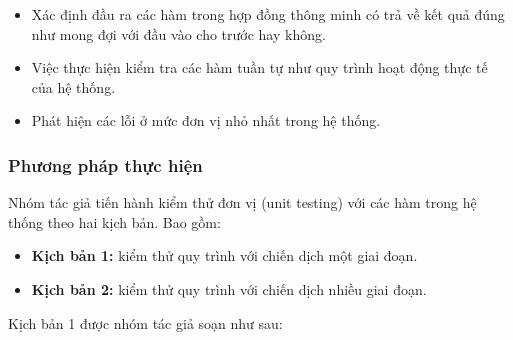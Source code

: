 \documentclass[../main-report.tex]{subfiles}
\begin{document}
\begin{itemize}
\item Xác định đầu ra các hàm trong hợp đồng thông minh có trả về kết quả đúng như mong đợi với đầu vào cho trước hay không.
\item Việc thực hiện kiểm tra các hàm tuần tự như quy trình hoạt động thực tế của hệ thống.
\item Phát hiện các lỗi ở mức đơn vị nhỏ nhất trong hệ thống.
\end{itemize}
\subsubsection{Phương pháp thực hiện}
Nhóm tác giả tiến hành kiểm thử đơn vị (unit testing) với các hàm trong hệ thống theo hai kịch bản. Bao gồm:

\begin{itemize}
\item \textbf{Kịch bản 1:} kiểm thử quy trình với chiến dịch một giai đoạn.
\item \textbf{Kịch bản 2:} kiểm thử quy trình với chiến dịch nhiều giai đoạn.
\end{itemize}

Kịch bản 1 được nhóm tác giả soạn như sau:
\end{document}
